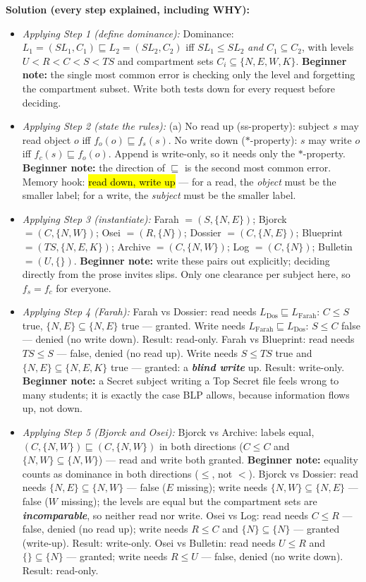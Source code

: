\documentclass[12pt, a4paper]{article}
\newcommand{\term}[1]{\textbf{\textit{#1}}}        %
\newcommand{\imp}[1]{\hl{#1}}                       %
\begin{document}
\textbf{Solution (every step explained, including WHY):}
\begin{itemize}
    \item \textit{Applying Step 1 (define dominance):} Dominance: $L_1 = (SL_1, C_1) \sqsubseteq L_2 = (SL_2, C_2)$ iff $SL_1 \leq SL_2$ \emph{and} $C_1 \subseteq C_2$, with levels $U < R < C < S < TS$ and compartment sets $C_i \subseteq \{N, E, W, K\}$. \textbf{Beginner note:} the single most common error is checking only the level and forgetting the compartment subset. Write both tests down for every request before deciding.
    \item \textit{Applying Step 2 (state the rules):} (a) No read up (ss-property): subject $s$ may read object $o$ iff $f_o(o) \sqsubseteq f_s(s)$. No write down ($*$-property): $s$ may write $o$ iff $f_c(s) \sqsubseteq f_o(o)$. Append is write-only, so it needs only the $*$-property. \textbf{Beginner note:} the direction of $\sqsubseteq$ is the second most common error. Memory hook: \imp{read down, write up} --- for a read, the \emph{object} must be the smaller label; for a write, the \emph{subject} must be the smaller label.
    \item \textit{Applying Step 3 (instantiate):} Farah $= (S, \{N,E\})$; Bjorck $= (C, \{N,W\})$; Osei $= (R, \{N\})$; Dossier $= (C, \{N,E\})$; Blueprint $= (TS, \{N,E,K\})$; Archive $= (C, \{N,W\})$; Log $= (C, \{N\})$; Bulletin $= (U, \{\})$. \textbf{Beginner note:} write these pairs out explicitly; deciding directly from the prose invites slips. Only one clearance per subject here, so $f_s = f_c$ for everyone.
    \item \textit{Applying Step 4 (Farah):} Farah vs Dossier: read needs $L_{\text{Dos}} \sqsubseteq L_{\text{Farah}}$: $C \leq S$ true, $\{N,E\} \subseteq \{N,E\}$ true --- granted. Write needs $L_{\text{Farah}} \sqsubseteq L_{\text{Dos}}$: $S \leq C$ false --- denied (no write down). Result: read-only. Farah vs Blueprint: read needs $TS \leq S$ --- false, denied (no read up). Write needs $S \leq TS$ true and $\{N,E\} \subseteq \{N,E,K\}$ true --- granted: a \term{blind write} up. Result: write-only. \textbf{Beginner note:} a Secret subject writing a Top Secret file feels wrong to many students; it is exactly the case BLP allows, because information flows up, not down.
    \item \textit{Applying Step 5 (Bjorck and Osei):} Bjorck vs Archive: labels equal, $(C, \{N,W\}) \sqsubseteq (C, \{N,W\})$ in both directions ($C \leq C$ and $\{N,W\} \subseteq \{N,W\}$) --- read and write both granted. \textbf{Beginner note:} equality counts as dominance in both directions ($\leq$, not $<$). Bjorck vs Dossier: read needs $\{N,E\} \subseteq \{N,W\}$ --- false ($E$ missing); write needs $\{N,W\} \subseteq \{N,E\}$ --- false ($W$ missing); the levels are equal but the compartment sets are \term{incomparable}, so neither read nor write. Osei vs Log: read needs $C \leq R$ --- false, denied (no read up); write needs $R \leq C$ and $\{N\} \subseteq \{N\}$ --- granted (write-up). Result: write-only. Osei vs Bulletin: read needs $U \leq R$ and $\{\} \subseteq \{N\}$ --- granted; write needs $R \leq U$ --- false, denied (no write down). Result: read-only.

\end{itemize}
\end{document}
